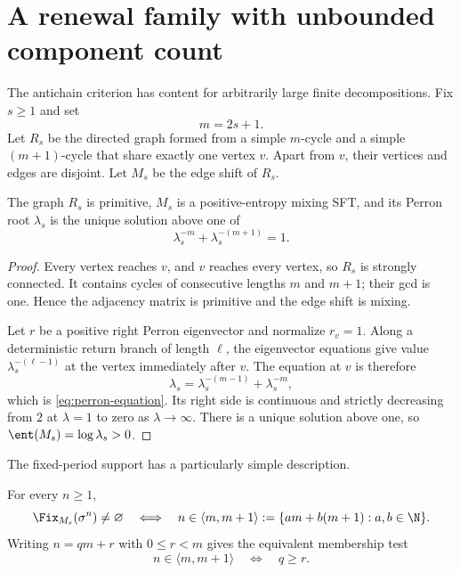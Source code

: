 \section{A renewal family with unbounded component count}
\label{sec:renewal}

The antichain criterion has content for arbitrarily large finite
decompositions.  Fix $s\geq1$ and set
\begin{equation}
  m=2s+1.
  \label{eq:m-def}
\end{equation}
Let $R_s$ be the directed graph formed from a simple $m$-cycle and a simple
$(m+1)$-cycle that share exactly one vertex $v$.  Apart from $v$, their
vertices and edges are disjoint.  Let $M_s$ be the edge shift of $R_s$.

\begin{proposition}
\label{prop:perron}
The graph $R_s$ is primitive, $M_s$ is a positive-entropy mixing SFT, and its
Perron root $\lambda_s$ is the unique solution above one of
\begin{equation}
  \lambda_s^{-m}+\lambda_s^{-(m+1)}=1.
  \label{eq:perron-equation}
\end{equation}
\end{proposition}

\begin{proof}
Every vertex reaches $v$, and $v$ reaches every vertex, so $R_s$ is strongly
connected.  It contains cycles of consecutive lengths $m$ and $m+1$; their
gcd is one.  Hence the adjacency matrix is primitive and the edge shift is
mixing.

Let $r$ be a positive right Perron eigenvector and normalize $r_v=1$.  Along
a deterministic return branch of length $\ell$, the eigenvector equations
give value $\lambda_s^{-(\ell-1)}$ at the vertex immediately after $v$.  The
equation at $v$ is therefore
\[
 \lambda_s
 =\lambda_s^{-(m-1)}+\lambda_s^{-m},
\]
which is \eqref{eq:perron-equation}.  Its right side is continuous and
strictly decreasing from $2$ at $\lambda=1$ to zero as
$\lambda\to\infty$.  There is a unique solution above one, so
$\ent(M_s)=\log\lambda_s>0$.
\end{proof}

The fixed-period support has a particularly simple description.

\begin{proposition}
\label{prop:renewal-support}
For every $n\geq1$,
\begin{equation}
 \Fix_{M_s}(\sigma^n)\ne\varnothing
 \quad\Longleftrightarrow\quad
 n\in\langle m,m+1\rangle
 :=\{am+b(m+1):a,b\in\N\}.
 \label{eq:renewal-support}
\end{equation}
Writing $n=qm+r$ with $0\leq r<m$ gives the equivalent membership test
\begin{equation}
  n\in\langle m,m+1\rangle
  \quad\Longleftrightarrow\quad q\geq r.
  \label{eq:qr-membership}
\end{equation}
\end{proposition}

